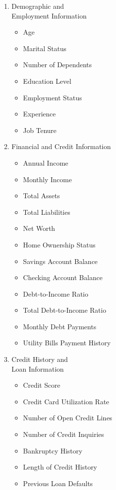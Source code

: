 \documentclass[12pt]{report}
\begin{document}
\begin{multicols}{2}
\begin{enumerate}
    \item Demographic and \\ Employment Information
    \begin{itemize}
        \item Age
        \item Marital Status
        \item Number of Dependents
        \item Education Level
        \item Employment Status
        \item Experience
        \item Job Tenure
    \end{itemize}
    \item Financial and Credit Information
    \begin{itemize}
        \item Annual Income
        \item Monthly Income
        \item Total Assets
        \item Total Liabilities
        \item Net Worth
        \item Home Ownership Status
        \item Savings Account Balance
        \item Checking Account Balance
        \item Debt-to-Income Ratio
        \item Total Debt-to-Income Ratio
        \item Monthly Debt Payments
        \item Utility Bills Payment History
    \end{itemize}
    \item Credit History and \\ Loan Information
    \begin{itemize}
        \item Credit Score
        \item Credit Card Utilization Rate
        \item Number of Open Credit Lines
        \item Number of Credit Inquiries
        \item Bankruptcy History
        \item Length of Credit History
        \item Previous Loan Defaults

\end{itemize}
\end{enumerate}
\end{multicols}
\end{document}
